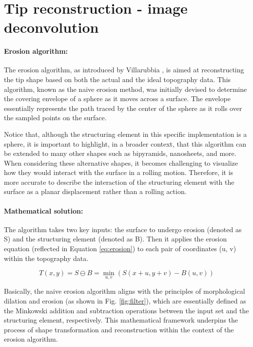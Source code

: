\section{Tip reconstruction - image deconvolution}

\paragraph{Erosion algorithm: }

The erosion algorithm, as introduced by Villarubbia \cite{scanning_microscope,Villarrubia}, is aimed at reconstructing the tip shape based on both the actual and the ideal topography data. This algorithm, known as the naive erosion method, was initially devised to determine the covering envelope of a sphere as it moves across a surface. The envelope essentially represents the path traced by the center of the sphere as it rolls over the sampled points on the surface.

Notice that, although the structuring element in this specific implementation is a sphere, it is important to highlight, in a broader context, that this algorithm can be extended to many other shapes such as bipyramids, nanosheets, and more. When considering these alternative shapes, it becomes challenging to visualize how they would interact with the surface in a rolling motion. Therefore, it is more accurate to describe the interaction of the structuring element with the surface as a planar displacement rather than a rolling action.

\paragraph{Mathematical solution: }

The algorithm takes two key inputs: the surface to undergo erosion (denoted as S) and the structuring element (denoted as B). Then it applies the erosion equation (reflected in Equation \ref{eq:erosion}) to each pair of coordinates (u, v) within the topography data.

\begin{equation}
    \label{eq:erosion}
    T(x, y) = S \ominus B = \min_{u, v}\left(S(x + u, y + v) - B(u, v)\right)
\end{equation}

Basically, the naive erosion algorithm aligns with the principles of morphological dilation and erosion (as shown in Fig. \ref{fig:filter}), which are essentially defined as the Minkowski addition and subtraction operations \cite{erosion_Minkowskische} between the input set and the structuring element, respectively. This mathematical framework underpins the process of shape transformation and reconstruction within the context of the erosion algorithm.


